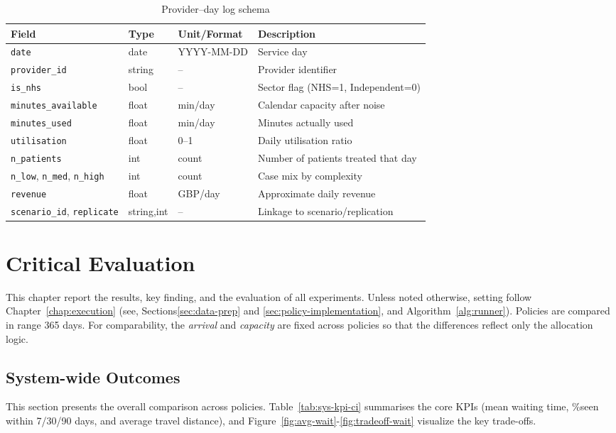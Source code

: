 \documentclass[ %
                    author={Nattanan Nawakitbamrung},
                supervisor={Dr. Sébastien Rochat},
                    degree={MSc},
                     title={Developing and Evaluating the Impact of a Single Patient Treatment List (PTL) for an NHS Integrated Care System},
                  subtitle={},
                      type={},
                      year={2025}]{dissertation}
\begin{document}
\begin{table}[htbp]
\small
\centering
\begin{tabularx}{\linewidth}{@{} l l l Y @{}}
\toprule
\textbf{Field} & \textbf{Type} & \textbf{Unit/Format} & \textbf{Description} \\
\midrule
\texttt{date} & date & YYYY-MM-DD & Service day \\
\texttt{provider\_id} & string & – & Provider identifier \\
\texttt{is\_nhs} & bool & – & Sector flag (NHS=1, Independent=0) \\
\texttt{minutes\_available} & float & min/day & Calendar capacity after noise \\
\texttt{minutes\_used} & float & min/day & Minutes actually used \\
\texttt{utilisation} & float & 0–1 & Daily utilisation ratio \\
\texttt{n\_patients} & int & count & Number of patients treated that day \\
\texttt{n\_low}, \texttt{n\_med}, \texttt{n\_high} & int & count & Case mix by complexity\footnotemark \\
\texttt{revenue} & float & GBP/day & Approximate daily revenue \\
\texttt{scenario\_id}, \texttt{replicate} & string,int & – & Linkage to scenario/replication \\
\bottomrule
\end{tabularx}
\caption{Provider–day log schema}
\label{tab:log-provider-day}
\end{table}


\chapter{Critical Evaluation}
\label{chap:evaluation}
This chapter report the results, key finding, and the evaluation of all experiments. Unless noted otherwise, setting follow Chapter~\ref{chap:execution} (see, Sections\ref{sec:data-prep} and \ref{sec:policy-implementation}, and Algorithm~\ref{alg:runner}). Policies are compared in range 365 days. For comparability, the \emph{arrival} and \emph{capacity} are fixed across policies so that the differences reflect only the allocation logic.

\section{System-wide Outcomes}
\label{sec:sys-wide}
This section presents the overall comparison across policies. Table~\ref{tab:sys-kpi-ci} summarises the core KPIs (mean waiting time, \%seen within 7/30/90 days, and average travel distance), and Figure~\ref{fig:avg-wait}-\ref{fig:tradeoff-wait} visualize the key trade-offs.
\end{document}

